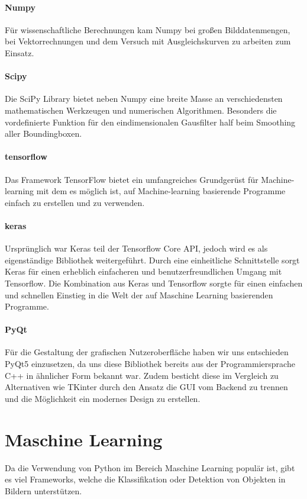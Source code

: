 \paragraph{Numpy}
Für wissenschaftliche Berechnungen kam Numpy bei großen Bilddatenmengen, bei Vektorrechnungen und dem Versuch mit Ausgleichskurven zu arbeiten zum Einsatz.

\paragraph{Scipy}
Die SciPy Library bietet neben Numpy eine breite Masse an verschiedensten mathematischen Werkzeugen und numerischen Algorithmen. Besonders die vordefinierte Funktion für den eindimensionalen Gausfilter half beim Smoothing aller Boundingboxen.

\paragraph{tensorflow}
Das Framework TensorFlow bietet ein umfangreiches Grundgerüst für Machine-learning mit dem es möglich ist, auf Machine-learning basierende Programme einfach zu erstellen und zu verwenden.

\paragraph{keras}
Ursprünglich war Keras teil der Tensorflow Core API, jedoch wird es als eigenständige Bibliothek weitergeführt. Durch eine einheitliche Schnittstelle sorgt Keras für einen erheblich einfacheren und benutzerfreundlichen Umgang mit Tensorflow. Die Kombination aus Keras und Tensorflow sorgte für einen einfachen und schnellen Einstieg in die Welt der auf Maschine Learning basierenden Programme.

\paragraph{PyQt}
Für die Gestaltung der grafischen Nutzeroberfläche haben wir uns entschieden PyQt5 einzusetzen, da uns diese Bibliothek bereits aus der Programmiersprache C++ in ähnlicher Form bekannt war. Zudem besticht diese im Vergleich zu Alternativen wie TKinter durch den Ansatz die GUI vom Backend zu trennen und die Möglichkeit ein modernes Design zu erstellen.

	
\section{Maschine Learning}
Da die Verwendung von Python im Bereich Maschine Learning populär ist, gibt es viel Frameworks, welche die Klassifikation oder Detektion von Objekten in Bildern unterstützen.

